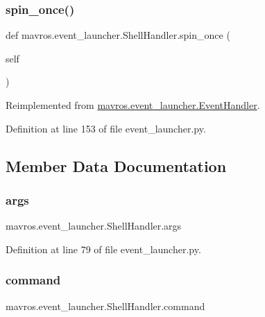 \subsubsection{\texorpdfstring{spin\_once()}{spin\_once()}}
{\footnotesize\ttfamily def mavros.\+event\+\_\+launcher.\+Shell\+Handler.\+spin\+\_\+once (\begin{DoxyParamCaption}\item[{}]{self }\end{DoxyParamCaption})}



Reimplemented from \mbox{\hyperlink{classmavros_1_1event__launcher_1_1EventHandler_a0d51c6a1ddc739d191fad148fa51dcd1}{mavros.\+event\+\_\+launcher.\+Event\+Handler}}.



Definition at line 153 of file event\+\_\+launcher.\+py.



\subsection{Member Data Documentation}
\mbox{\label{classmavros_1_1event__launcher_1_1ShellHandler_a118590103db90fa1e414f3e592ae8bc7}} 
\subsubsection{\texorpdfstring{args}{args}}
{\footnotesize\ttfamily mavros.\+event\+\_\+launcher.\+Shell\+Handler.\+args}



Definition at line 79 of file event\+\_\+launcher.\+py.

\mbox{\label{classmavros_1_1event__launcher_1_1ShellHandler_a0297802ce5086d8bdc70e72ef201446d}} 
\subsubsection{\texorpdfstring{command}{command}}
{\footnotesize\ttfamily mavros.\+event\+\_\+launcher.\+Shell\+Handler.\+command}



